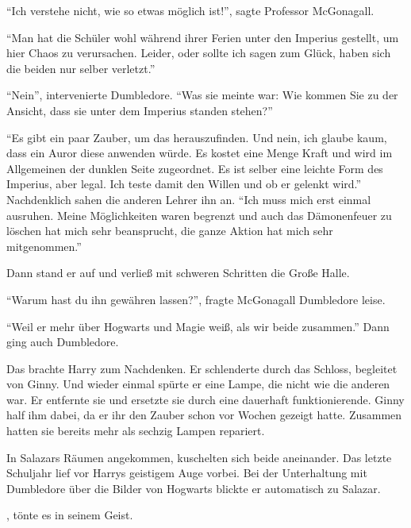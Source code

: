 \enquote{Ich verstehe nicht, wie so etwas möglich ist!}, sagte Professor McGonagall.

\enquote{Man hat die Schüler wohl während ihrer Ferien unter den Imperius gestellt, um hier Chaos zu verursachen. Leider, oder sollte ich sagen zum Glück, haben sich die beiden nur selber verletzt.}

\enquote{Nein}, intervenierte Dumbledore. \enquote{Was sie meinte war: Wie kommen Sie zu der Ansicht, dass sie unter dem Imperius standen \gst stehen?}

\enquote{Es gibt ein paar Zauber, um das herauszufinden. Und nein, ich glaube kaum, dass ein Auror diese anwenden würde. Es kostet eine Menge Kraft und wird im Allgemeinen der dunklen Seite zugeordnet. Es ist selber eine leichte Form des Imperius, aber legal. Ich teste damit den Willen und ob er gelenkt wird.} Nachdenklich sahen die anderen Lehrer ihn an. \enquote{Ich muss mich erst einmal ausruhen. Meine Möglichkeiten waren begrenzt und auch das Dämonenfeuer zu löschen hat mich sehr beansprucht, die ganze Aktion hat mich sehr mitgenommen.}

Dann stand er auf und verließ mit schweren Schritten die Große Halle.

\enquote{Warum hast du ihn gewähren lassen?}, fragte McGonagall Dumbledore leise.

\enquote{Weil er mehr über Hogwarts und Magie weiß, als wir beide zusammen.} Dann ging auch Dumbledore.

Das brachte Harry zum Nachdenken. Er schlenderte durch das Schloss, begleitet von Ginny. Und wieder einmal spürte er eine Lampe, die nicht wie die anderen war. Er entfernte sie und ersetzte sie durch eine dauerhaft funktionierende. Ginny half ihm dabei, da er ihr den Zauber schon vor Wochen gezeigt hatte. Zusammen hatten sie bereits mehr als sechzig Lampen repariert.

In Salazars Räumen angekommen, kuschelten sich beide aneinander. Das letzte Schuljahr lief vor Harrys geistigem Auge vorbei. Bei der Unterhaltung mit Dumbledore über die Bilder von Hogwarts blickte er automatisch zu Salazar.

, tönte es in seinem Geist. 



